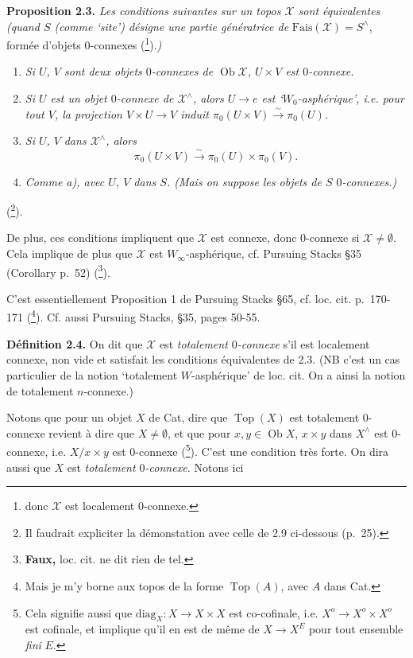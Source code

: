 \documentclass[11pt]{article}
\newcommand{\printedpage}[1]{\marginpar{\footnotesize p.~#1}}
\newcommand{\msp}[1]{\marginpar{\footnotesize [#1]}}
\newcommand{\sX}{\mathcal{X}} %
\begin{document}
\noindent\textbf{Proposition 2.3.} \textit{Les conditions suivantes sur un topos $\sX$ sont équivalentes (quand $S$ (comme `site') désigne une partie génératrice de} $\mathrm{Fais}(\sX) = S^{\wedge}$, formée d'objets 0-connexes (\footnote[23]{donc $\sX$ est localement 0-connexe.}).\textit{)}
\begin{enumerate}[label={},leftmargin=3em]
\item[\textit{a)}] \textit{Si $U$, $V$ sont deux objets $0$-connexes de $\operatorname{Ob} \sX$, $U \times V$ est $0$-connexe.}
\item[\textit{b)}] \textit{Si $U$ est un objet $0$-connexe de $\sX^{\wedge}$, alors $U \longrightarrow e$ est `$W_0$-asphérique', i.e. pour tout $V$, la projection $V \times U \longrightarrow V$ induit $\pi_0(U \times V) \xrightarrow{\sim} \pi_0(U)$.}
\item[\textit{c)}] \textit{Si $U$, $V$} \textit{dans $\sX^{\wedge}$, alors}
\[
\pi_0(U \times V) \xrightarrow{\sim} \pi_0(U) \times \pi_0(V).
\]
\item[\textit{d)}] \textit{Comme a), avec $U$, $V$ dans $S$. (Mais on suppose les objets de $S$ $0$-connexes.)}
\end{enumerate}
\noindent(\footnote[24]{Il faudrait expliciter la démonstation avec celle de 2.9 ci-dessous (p.~25).}). %

\msp{page 18}

\noindent De plus, ces conditions impliquent que $\sX$ est connexe, donc 0-connexe si $\sX \neq \emptyset$. Cela implique de plus que $\sX$ est $W_{\infty}$-asphérique, cf. Pursuing Stacks §35 (Corollary p.~52) (\footnote[25]{\textbf{Faux,} loc. cit. ne dit rien de tel.}).

C'est essentiellement Proposition 1 de Pursuing Stacks §65, cf. loc. cit. p.~170-171 (\footnote[26]{Mais je m'y borne aux topos de la forme $\operatorname{Top}(A)$, avec $A$ dans Cat.}). Cf. aussi Pursuing Stacks, §35, pages 50-55.

\printedpage{12}

\noindent\textbf{Définition 2.4.} On dit que $\sX$ est \textit{totalement $0$-connexe} s'il est localement connexe, non vide et satisfait les conditions équivalentes de 2.3. (NB c'est un cas particulier de la notion `totalement $W$-asphérique' de loc. cit. On a ainsi la notion de totalement $n$-connexe.)

Notons que pour un objet $X$ de Cat, dire que $\operatorname{Top}(X)$ est totalement 0-connexe revient à dire que $X \neq \emptyset$, et que pour $x, y \in \operatorname{Ob} X$, $x \times y$ dans $X^{\wedge}$ est 0-connexe, i.e. $X/x \times y$ est 0-connexe (\footnote[27]{Cela signifie aussi que $\mathrm{diag}_X : X \longrightarrow X \times X$ est co-cofinale, i.e. $X^o \longrightarrow X^o \times X^o$ est cofinale, et implique qu'il en est de même de $X \longrightarrow X^E$ pour tout ensemble \textit{fini} $E$.}). C'est une condition très forte. On dira aussi que $X$ est \textit{totalement $0$-connexe.} Notons ici
\end{document}

